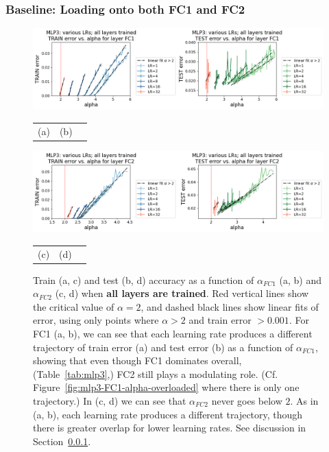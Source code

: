 \subsubsection{Baseline: Loading onto both FC1 and FC2}
\label{sxn:hysteresis_baseline}
\begin{figure}[t] %
    \centering
        \includegraphics[width=12cm]{img/alpha_by_scales/mlp3_error_by_LR_all_FC1_binned.png} \\
    \begin{tabular}{ccc}
      (a)\hspace{5cm} & (b) 
    \end{tabular}
        \includegraphics[width=12cm]{img/alpha_by_scales/mlp3_error_by_LR_all_FC2_binned.png}
    \begin{tabular}{ccc}
      (c)\hspace{5cm} & (d) \\
    \end{tabular}
    \caption{
        Train (a, c) and test (b, d) accuracy as a function of $\alpha_{FC1}$ (a, b) and $\alpha_{FC2}$ (c, d) when {\bf all 
        layers are trained}. Red vertical lines show the critical value of $\alpha = 2$, and dashed black lines show 
        linear fits of error, using only points where $\alpha > 2$ and train error $> 0.001$. 
        For FC1 (a, b), we can see that each learning rate 
        produces a different trajectory of train error (a) and test error (b) as a function of $\alpha_{FC1}$, 
        showing that even though FC1 dominates overall, (Table~\ref{tab:mlp3},) FC2 still plays a modulating role. 
        (Cf. Figure~\ref{fig:mlp3-FC1-alpha-overloaded} where there is only one trajectory.)
        In (c, d) we can see that $\alpha_{FC2}$ never goes below $2$. As in (a, b), each learning rate 
        produces a different trajectory, though there is greater overlap for lower learning rates. See discussion in 
        Section~\ref{sxn:hysteresis_baseline}.
    }
    \label{fig:mlp3-baseline-load}
\end{figure}


